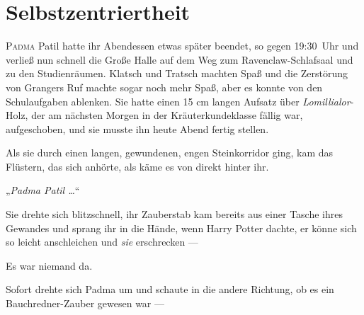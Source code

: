 \chapter{Selbstzentriertheit}

\lettrine{P}{adma} Patil hatte ihr Abendessen etwas später beendet, so gegen 19:30~Uhr und verließ nun schnell die Große Halle auf dem Weg zum Ravenclaw-Schlafsaal und zu den Studienräumen. Klatsch und Tratsch machten Spaß und die Zerstörung von Grangers Ruf machte sogar noch mehr Spaß, aber es konnte von den Schulaufgaben ablenken. Sie hatte einen 15 cm langen Aufsatz über \emph{Lomillialor}-Holz, der am nächsten Morgen in der Kräuterkundeklasse fällig war, aufgeschoben, und sie musste ihn heute Abend fertig stellen.

Als sie durch einen langen, gewundenen, engen Steinkorridor ging, kam das Flüstern, das sich anhörte, als käme es von direkt hinter ihr.

„\emph{Padma Patil …}“

Sie drehte sich blitzschnell, ihr Zauberstab kam bereits aus einer Tasche ihres Gewandes und sprang ihr in die Hände, wenn Harry Potter dachte, er könne sich so leicht anschleichen und \emph{sie} erschrecken —

Es war niemand da.

Sofort drehte sich Padma um und schaute in die andere Richtung, ob es ein Bauchredner-Zauber gewesen war —

